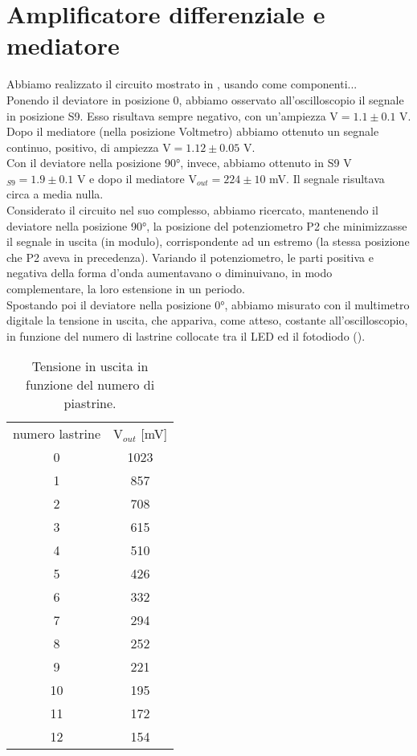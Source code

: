 \section{Amplificatore differenziale e mediatore}
Abbiamo realizzato il circuito mostrato in , usando come componenti...\\
Ponendo il deviatore in posizione 0, abbiamo osservato all'oscilloscopio il segnale in posizione S9. Esso risultava sempre negativo, con un'ampiezza V$ = 1.1 \pm 0.1$ V. Dopo il mediatore (nella posizione Voltmetro) abbiamo ottenuto un segnale continuo, positivo, di ampiezza V$ = 1.12 \pm 0.05$ V.\\
Con il deviatore nella posizione 90°, invece, abbiamo ottenuto in S9 V$_{S9} = 1.9 \pm 0.1$ V e dopo il mediatore V$_{out} = 224 \pm 10$ mV. Il segnale risultava circa a media nulla.\\
Considerato il circuito nel suo complesso, abbiamo ricercato, mantenendo il deviatore nella posizione 90°, la posizione del potenziometro P2 che minimizzasse il segnale in uscita (in modulo), corrispondente ad un estremo (la stessa posizione che P2 aveva in precedenza). Variando il potenziometro, le parti positiva e negativa della forma d'onda aumentavano o diminuivano, in modo complementare, la loro estensione in un periodo.\\ Spostando poi il deviatore nella posizione 0°, abbiamo misurato con il multimetro digitale la tensione in uscita, che appariva, come atteso, costante all'oscilloscopio, in funzione del numero di lastrine collocate tra il LED ed il fotodiodo ().\\
\begin{table}[h]
	\centering
	\begin{tabular}{cc}		
		{numero lastrine} & {V$_{out}$ [mV]}\\
                      0 & 1023\\
                      1 & 857\\
                      2 & 708\\
                      3 & 615\\
                      4 & 510\\
                      5 & 426\\
                      6 & 332\\
                      7 & 294\\
                      8 & 252\\
                      9 & 221\\
                     10 & 195\\
                     11 & 172\\
                     12 & 154\\
	           \midrule
	
 	\end{tabular}
	\caption{Tensione in uscita in funzione del numero di piastrine. }
	\label{t:Fotodiodo}
\end{table}
